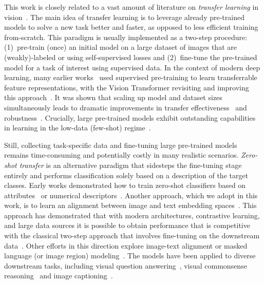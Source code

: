 \documentclass[10pt,twocolumn,letterpaper]{article}
\begin{document}
This work is closely related to a vast amount of literature on \textit{transfer learning} in vision~\cite{transfer_learning_survey,survey2018}.
The main idea of transfer learning is to leverage already pre-trained models to solve a new task better and faster, as opposed to less efficient training from-scratch. 
This paradigm is usually implemented as a two-step procedure: (1)~pre-train (once) an initial model on a large dataset of images that are (weakly)-labeled or using self-supervised losses and (2)~fine-tune the pre-trained model for a task of interest using supervised data.
In the context of modern deep learning, many earlier works~\cite{decaf,off-the-shelf,imagenet_transfer_better,bit} used supervised pre-training to learn transferrable feature representations, with the Vision Transformer revisiting and improving this approach~\cite{vit,vitg}.
It was shown that scaling up model and dataset sizes simultaneously leads to dramatic improvements in transfer effectiveness~\cite{bit,vit,vitg} and robustness~\cite{robustness_transferability_cnn}.
Crucially, large pre-trained models exhibit outstanding capabilities in learning in the low-data (few-shot) regime~\cite{bit,vit,ting_ss}.

Still, collecting task-specific data and fine-tuning large pre-trained models remains time-consuming and potentially costly in many realistic scenarios. 
\textit{Zero-shot transfer} is an alternative paradigm that sidesteps the fine-tuning stage entirely and performs classification solely based on a description of the target classes. 
Early works demonstrated how to train zero-shot classifiers based on attributes~\cite{visual_attribute} or numerical descriptors~\cite{zero_data_learning}.
Another approach, which we adopt in this work, is to learn an alignment between image and text embedding spaces~\cite{devise,vse,karpathy,vse-pooling,virtex,convirt}. 
This approach has demonstrated that with modern architectures, contrastive learning, and large data sources it is possible to obtain performance that is competitive with the classical two-step approach that involves fine-tuning on the downstream data~\cite{clip,align}. 
Other efforts in this direction explore image-text alignment or masked language (or image region) modeling~\cite{VisualBERT,uniter}. 
The models have been applied to diverse downstream tasks, including visual question answering~\cite{vqa2}, visual commonsense reasoning~\cite{vcr} and image captioning~\cite{ViLBERT,VL-BERT,12-in-1}. 
\end{document}
